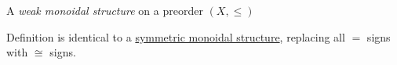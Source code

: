 A \emph{weak monoidal structure} on a preorder $(X, \leq)$

Definition is identical to a \hyperref[D2.2]{symmetric monoidal structure}, replacing all $=$ signs with $\cong$ signs.
